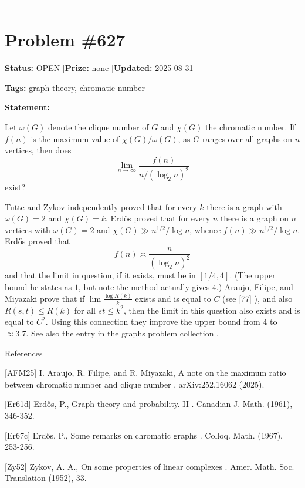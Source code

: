 \documentclass{article}
\begin{document}
\noindent\rule{\linewidth}{0.4pt}


\section{Problem \#627}
\label{prob:627}

\noindent\textbf{Status:} OPEN \quad|\quad \textbf{Prize:} none \quad|\quad \textbf{Updated:} 2025-08-31

\noindent\textbf{Tags:} graph theory, chromatic number

\medskip

\noindent\textbf{Statement:}

Let $\omega(G)$ denote the clique number of $G$ and $\chi(G)$ the chromatic number. If $f(n)$ is the maximum value of $\chi(G)/\omega(G)$, as $G$ ranges over all graphs on $n$ vertices, then does\[\lim_{n\to\infty}\frac{f(n)}{n/(\log_2n)^2}\]exist?




Tutte and Zykov \cite{Zy52} independently proved that for every $k$ there is a graph with $\omega(G)=2$ and $\chi(G)=k$. Erd\H{o}s \cite{Er61d} proved that for every $n$ there is a graph on $n$ vertices with $\omega(G)=2$ and $\chi(G)\gg n^{1/2}/\log n$, whence $f(n) \gg n^{1/2}/\log n$. Erd\H{o}s \cite{Er67c} proved that\[f(n) \asymp \frac{n}{(\log_2n)^2}\]and that the limit in question, if it exists, must be in $[1/4,4]$. (The upper bound he states as $1$, but \cite{AFM25} note the method actually gives $4$.) Araujo, Filipe, and Miyazaki \cite{AFM25} prove that if $\lim\frac{\log R(k)}{k}$ exists and is equal to $C$ (see [77] ), and also $R(s,t)\leq R(k)$ for all $st\leq k^2$, then the limit in this question also exists and is equal to $C^2$. Using this connection they improve the upper bound from $4$ to $\approx 3.7$. See also the entry in the graphs problem collection .




References

[AFM25] I. Araujo, R. Filipe, and R. Miyazaki, A note on the maximum ratio between chromatic number and clique number . arXiv:252.16062 (2025).

[Er61d] Erd\H{o}s, P., Graph theory and probability. II . Canadian J. Math. (1961), 346-352.

[Er67c] Erd\H{o}s, P., Some remarks on chromatic graphs . Colloq. Math. (1967), 253-256.

[Zy52] Zykov, A. A., On some properties of linear complexes . Amer. Math. Soc. Translation (1952), 33.
\end{document}
